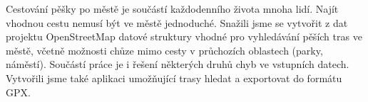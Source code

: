 Cestování pěšky po městě je součástí každodenního života mnoha lidí. Najít
vhodnou cestu nemusí být ve městě jednoduché. Snažili jsme se vytvořit z dat
projektu OpenStreetMap datové struktury vhodné pro vyhledávání pěších tras ve
městě, včetně možnosti chůze mimo cesty v průchozích oblastech (parky, náměstí). 
Součástí práce je i řešení některých druhů chyb ve vstupních datech. Vytvořili
jsme také aplikaci umožňující trasy hledat a exportovat do formátu GPX.

